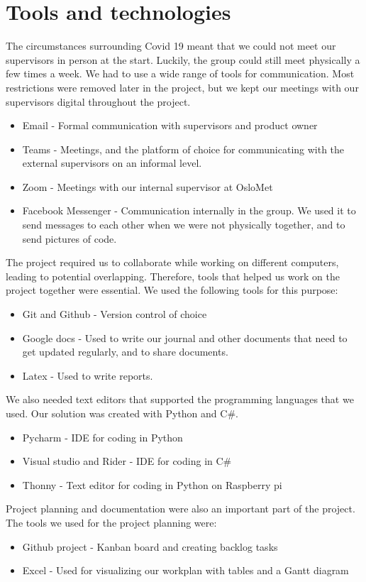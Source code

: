 \section{Tools and technologies}
The circumstances surrounding Covid 19 meant that we could not meet our supervisors in person at the start. Luckily, the group could still meet physically a few times a week. We had to use a wide range of tools for communication. Most restrictions were removed later in the project, but we kept our meetings with our supervisors digital throughout the project. 

\begin{itemize}
	\item Email - Formal communication with supervisors and product owner
	\item Teams - Meetings, and the platform of choice for communicating with the external supervisors on an informal level. 
	\item Zoom - Meetings with our internal supervisor at OsloMet
	\item Facebook Messenger - Communication internally in the group. We used it to send messages to each other when we were not physically together, and to send pictures of code. 
\end{itemize}

The project required us to collaborate while working on different computers, leading to potential overlapping. Therefore, tools that helped us work on the project together were essential. We used the following tools for this purpose:

\begin{itemize}
	\item Git and Github - Version control of choice
	\item Google docs - Used to write our journal and other documents that need to get updated regularly, and to share documents. 
	\item Latex - Used to write reports.
\end{itemize}

We also needed text editors that supported the programming languages that we used. Our solution was created with Python and C\#.
\begin{itemize}
	\item Pycharm - IDE for coding in Python
	\item Visual studio and Rider - IDE for coding in C\#
	\item Thonny - Text editor for coding in Python on Raspberry pi
\end{itemize}

Project planning and documentation were also an important part of the project. The tools we used for the project planning were:

\begin{itemize}
	\item Github project - Kanban board and creating backlog tasks
	\item Excel - Used for visualizing our workplan with tables and a Gantt diagram
\end{itemize}